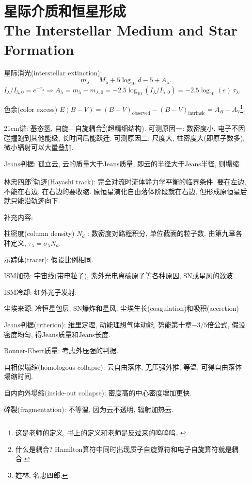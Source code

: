 \chapter{星际介质和恒星形成\\The Interstellar Medium and Star Formation}

星际消光(interstellar extinction):
\begin{equation*}
    m_\lambda=M_\lambda+5\log_{10}d-5+A_\lambda.
\end{equation*}
$I_\lambda/I_{\lambda,0}=e^{-\tau_\lambda}\Rightarrow A_\lambda=m_\lambda-m_{\lambda,0}=-2.5\log_{10}(I_\lambda/I_{\lambda,0})=-2.5\log_{10}(e)\,\tau_\lambda$.

色余(color excess) $E(B-V)=(B-V)_\text{observed}-(B-V)_\text{intrinsic}=A_B-A_V$\footnote{这是老师的定义, 书上的定义和老师是反过来的呜呜呜\dots}.

21cm谱: 基态氢, 自旋---自旋耦合\footnote{什么是耦合? Hamilton算符中同时出现质子自旋算符和电子自旋算符就是耦合.}(超精细结构). 可测原因一: 数密度小, 电子不因碰撞跑到其他能级, 长时间后能跃迁. 可测原因二: 尺度大, 柱密度大(即原子数多), 微小辐射可以大量叠加.

Jeans判据: 孤立云, 云的质量大于Jeans质量, 即云的半径大于Jeans半径, 则塌缩.

林忠四郎\footnote{姓林, 名忠四郎.}轨迹(Hayashi track): 完全对流时流体静力学平衡的临界条件. 要在左边, 不能在右边, 在右边的要收缩. 原恒星演化自由落体阶段就在右边, 但形成原恒星后就只能沿轨迹向下.

补充内容:

柱密度(column density) $N_{d}$ : 数密度对路程积分, 单位截面的粒子数. 由第九章各种定义, $\tau_\lambda=\sigma_\lambda N_{d}$.

示踪体(tracer): 假设比例相同.

ISM加热: 宇宙线(带电粒子), 紫外光电离碳原子等各种原因, SN或星风的激波.

ISM冷却: 红外光子发射.

尘埃来源: 冷恒星包层, SN爆炸和星风, 尘埃生长(coagulation)和吸积(accretion)

Jeans判据(criterion): 维里定理, 动能理想气体动能, 势能第十章$-3/5$倍公式, 假设密度均匀, 得Jeans质量和Jeans长度.

Bonner-Ebert质量: 考虑外压强的判据.

自相似塌缩(homologous collapse): 云自由落体, 无压强外推, 等温, 可得自由落体塌缩时间.

自内向外塌缩(inside-out collapse): 密度高的中心密度增加更快.

碎裂(fragmentation): 不等温, 因为云不透明, 辐射加热云.

